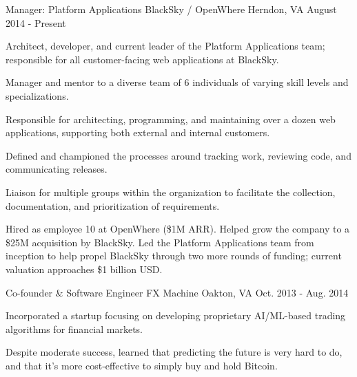 

\begin{cventries}

  \cventry
    {Manager: Platform Applications} %
    {BlackSky / OpenWhere} %
    {Herndon, VA} %
    {August 2014 - Present} %
    {
      \begin{cvitems} %
        \item {Architect, developer, and current leader of the Platform Applications team; responsible for all customer-facing web applications at BlackSky.}
        \item {Manager and mentor to a diverse team of 6 individuals of varying skill levels and specializations.}
        \item {Responsible for architecting, programming, and maintaining over a dozen web applications, supporting both external and internal customers.}
        \item {Defined and championed the processes around tracking work, reviewing code, and communicating releases.}
        \item {Liaison for multiple groups within the organization to facilitate the collection, documentation, and prioritization of requirements.}
      \end{cvitems}
    }
    {
      \begin{cvparagraph}
        \vspace*{-7mm}
      \end{cvparagraph}
    }
    {
      \begin{cvparagraph}
Hired as employee 10 at OpenWhere (\$1M ARR).
Helped grow the company to a \$25M acquisition by BlackSky.
Led the Platform Applications team from inception to help propel BlackSky through two more rounds of funding; current valuation approaches \$1 billion USD.
      \end{cvparagraph}
    }

  \cventry
    {Co-founder \& Software Engineer} %
    {FX Machine} %
    {Oakton, VA} %
    {Oct. 2013 - Aug. 2014} %
    {
      \begin{cvitems} %
        \item {Incorporated a startup focusing on developing proprietary AI/ML-based trading algorithms for financial markets.}
        \item {Despite moderate success, learned that predicting the future is very hard to do, and that it's more cost-effective to simply buy and hold Bitcoin.}
      \end{cvitems}
    }


\end{cventries}
